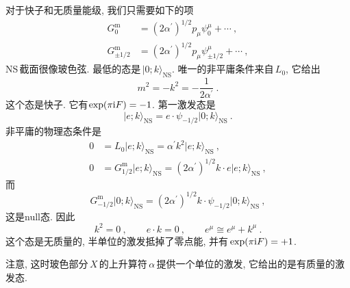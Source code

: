 对于快子和无质量能级, 我们只需要如下的项
\begin{subequations}
    \begin{align}
        G_{0}^{\text{m}} &= (2\alpha^{\prime})^{1/2} p_{\mu}\psi_{0}^{\mu} +\cdots \:, \label{10.5.6a} \\
        G_{\pm 1/2}^{\text{m}} &= (2\alpha^{\prime})^{1/2} p_{\mu}\psi_{\pm 1/2}^{\mu} +\cdots \:, \label{10.5.6b}
    \end{align} \label{10.5.6}
\end{subequations}
NS\,截面很像玻色弦. 最低的态是$\,\lvert 0;k\rangle_{\text{NS}}$. 唯一的非平庸条件来自$\,L_{0}$, 它给出
\begin{equation}
    m^{2}=-k^{2} = -\frac{1}{2\alpha^{\prime}} \:. \label{10.5.7}
\end{equation}
这个态是快子. 它有$\exp(\pi\mathrm{i} F)=-1$. 第一激发态是
\begin{equation}
    \lvert e;k \rangle_{\text{NS}} = e\cdot \psi_{-1/2} \lvert 0;k\rangle _{\text{NS}} \:. \label{10.5.8}
\end{equation}
非平庸的物理态条件是
\begin{subequations}
    \begin{align}
        0 &= L_{0} \lvert e;k\rangle_{\text{NS}}=\alpha^{\prime} k^{2} \lvert e;k\rangle_{\text{NS}} \:, \label{10.5.9a} \\
        0 &= G_{1/2}^{\text{m}}\lvert e;k\rangle_{\text{NS}}=(2\alpha^{\prime})^{1/2}k\cdot e\lvert e;k\rangle_{\text{NS}}\:, \label{10.5.9b}
    \end{align} \label{10.5.9}
\end{subequations}
而
\begin{equation}
    G_{-1/2}^{\text{m}}\lvert 0;k\rangle_{\text{NS}}=(2\alpha^{\prime})^{1/2}k\cdot \psi_{-1/2}
    \lvert 0;k\rangle_{\text{NS}}\:, \label{10.5.10}
\end{equation}
这是null态. 因此
\begin{equation}
    k^{2}=0 \:,\qquad e\cdot k=0\:, \qquad e^{\mu}\cong e^{\mu} + k^{\mu} \:. \label{10.5.11}
\end{equation}
这个态是无质量的, 半单位的激发抵掉了零点能, 并有$\,\exp(\pi\mathrm{i} F)=+1$. 
\begin{tcolorbox}
注意, 这时玻色部分$\,X\,$的上升算符$\,\alpha\,$提供一个单位的激发, 它给出的是有质量的激发态.
\end{tcolorbox}

